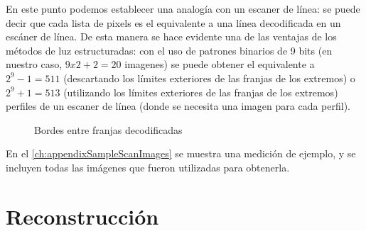 En este punto podemos establecer una analogía con un escaner de línea: se puede decir que cada lista de pixels es el equivalente a una línea decodificada en un escáner de línea. De esta manera se hace evidente una de las ventajas de los métodos de luz estructuradas: con el uso de patrones binarios de 9 bits (en nuestro caso, $9 x 2 + 2 = 20$ imagenes) se puede obtener el equivalente a $2^{9} - 1 = 511$ (descartando los límites exteriores de las franjas de los extremos) o $2^{9} + 1 = 513$ (utilizando los límites exteriores de las franjas de los extremos) perfiles de un escaner de línea (donde se necesita una imagen para cada perfil).

\begin{figure}[!bth]
    \myfloatalign
        \caption{Bordes entre franjas decodificadas}
        \label{fig:ejemploDecodificacionBordes}
\end{figure}

En el \autoref{ch:appendixSampleScanImages} se muestra una medición de ejemplo, y se incluyen todas las imágenes que fueron utilizadas para obtenerla.

\section{Reconstrucción}

